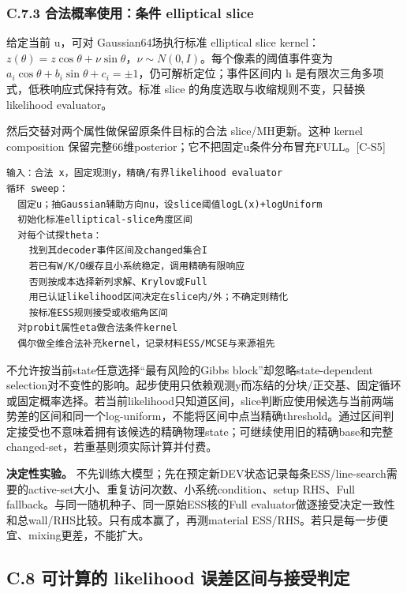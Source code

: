 \documentclass[
  11pt,
  a4paper,
]{article}
\begin{document}
\hypertarget{c.7.3-ux5408ux6cd5ux6982ux7387ux4f7fux7528ux6761ux4ef6-elliptical-slice}{%
\subsubsection{C.7.3 合法概率使用：条件 elliptical
slice}\label{c.7.3-ux5408ux6cd5ux6982ux7387ux4f7fux7528ux6761ux4ef6-elliptical-slice}}

给定当前 u，可对 Gaussian64场执行标准 elliptical slice
kernel：\(z(\theta)=z\cos\theta+\nu\sin\theta\)，\(\nu\sim N(0,I)\)。每个像素的阈值事件变为
\(a_i\cos\theta+b_i\sin\theta+c_i=\pm1\)，仍可解析定位；事件区间内 h
是有限次三角多项式，低秩响应式保持有效。标准 slice
的角度选取与收缩规则不变，只替换 likelihood evaluator。

然后交替对两个属性做保留原条件目标的合法 slice/MH更新。这种 kernel
composition
保留完整66维posterior；它不把固定u条件分布冒充FULL。{[}C-S5{]}

\begin{verbatim}
输入：合法 x，固定观测y，精确/有界likelihood evaluator
循环 sweep：
  固定u；抽Gaussian辅助方向nu，设slice阈值logL(x)+logUniform
  初始化标准elliptical-slice角度区间
  对每个试探theta：
    找到其decoder事件区间及changed集合I
    若已有W/K/O缓存且小系统稳定，调用精确有限响应
    否则按成本选择新列求解、Krylov或Full
    用已认证likelihood区间决定在slice内/外；不确定则精化
    按标准ESS规则接受或收缩角区间
  对probit属性eta做合法条件kernel
  偶尔做全维合法补充kernel，记录材料ESS/MCSE与来源祖先
\end{verbatim}

不允许按当前state任意选择``最有风险的Gibbs block''却忽略state-dependent
selection对不变性的影响。起步使用只依赖观测y而冻结的分块/正交基、固定循环或固定概率选择。若当前likelihood只知道区间，slice判断应使用候选与当前两端势差的区间和同一个log-uniform，不能将区间中点当精确threshold。通过区间判定接受也不意味着拥有该候选的精确物理state；可继续使用旧的精确base和完整changed-set，若重基则须实际计算并付费。

\textbf{决定性实验。}
不先训练大模型；先在预定新DEV状态记录每条ESS/line-search需要的active-set大小、重复访问次数、小系统condition、setup
RHS、Full fallback。与同一随机种子、同一原始ESS核的Full
evaluator做逐接受决定一致性和总wall/RHS比较。只有成本赢了，再测material
ESS/RHS。若只是每一步便宜、mixing更差，不能扩大。

\hypertarget{c.8-ux53efux8ba1ux7b97ux7684-likelihood-ux8befux5deeux533aux95f4ux4e0eux63a5ux53d7ux5224ux5b9a}{%
\subsection{C.8 可计算的 likelihood
误差区间与接受判定}\label{c.8-ux53efux8ba1ux7b97ux7684-likelihood-ux8befux5deeux533aux95f4ux4e0eux63a5ux53d7ux5224ux5b9a}}
\end{document}

